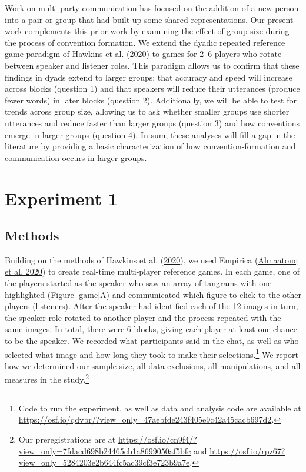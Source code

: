 \documentclass[
  english,
  a4paper,
]{article}
\begin{document}
Work on multi-party communication has focused on the addition of a new person into a pair or group that had built up some shared representations. Our present work complements this prior work by examining the effect of group size during the process of convention formation. We extend the dyadic repeated reference game paradigm of Hawkins et al. (\protect\hyperlink{ref-hawkinsCharacterizingDynamicsLearning2020}{2020}) to games for 2--6 players who rotate between speaker and listener roles. This paradigm allows us to confirm that these findings in dyads extend to larger groups: that accuracy and speed will increase across blocks (question 1) and that speakers will reduce their utterances (produce fewer words) in later blocks (question 2). Additionally, we will be able to test for trends across group size, allowing us to ask whether smaller groups use shorter utterances and reduce faster than larger groups (question 3) and how conventions emerge in larger groups (question 4). In sum, these analyses will fill a gap in the literature by providing a basic characterization of how convention-formation and communication occurs in larger groups.

\hypertarget{experiment-1}{%
\section{Experiment 1}\label{experiment-1}}

\hypertarget{methods}{%
\subsection{Methods}\label{methods}}

Building on the methods of Hawkins et al. (\protect\hyperlink{ref-hawkinsCharacterizingDynamicsLearning2020}{2020}), we used Empirica (\protect\hyperlink{ref-almaatouqEmpiricaVirtualLab2020}{Almaatouq et al. 2020}) to create real-time multi-player reference games. In each game, one of the players started as the speaker who saw an array of tangrams with one highlighted (Figure \ref{game}A) and communicated which figure to click to the other players (listeners). After the speaker had identified each of the 12 images in turn, the speaker role rotated to another player and the process repeated with the same images. In total, there were 6 blocks, giving each player at least one chance to be the speaker. We recorded what participants said in the chat, as well as who selected what image and how long they took to make their selections.\footnote{Code to run the experiment, as well as data and analysis code are available at \url{https://osf.io/qdvbr/?view_only=47aebfde243f405e9c42a45cacb697d2}.} We report how we determined our sample size, all data exclusions, all manipulations, and all measures in the study.\footnote{Our preregistrations are at \url{https://osf.io/cn9f4/?view_only=7fdacd698b24465cb1a8699050af5bfc} and \url{https://osf.io/rpz67?view_only=5284203e2b644fc5ac39cf3e723b9a7e}.}
\end{document}

